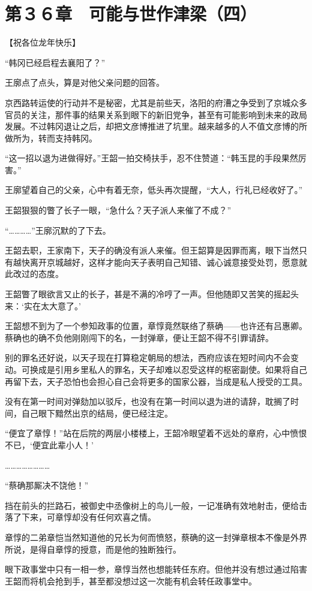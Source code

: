 \section{第３６章　可能与世作津梁（四）}

【祝各位龙年快乐】

“韩冈已经启程去襄阳了？”

王廓点了点头，算是对他父亲问题的回答。

京西路转运使的行动并不是秘密，尤其是前些天，洛阳的府漕之争受到了京城众多官员的关注，那件事的结果关系到眼下的新旧党争，甚至有可能影响到未来的政局发展。不过韩冈退让之后，却把文彦博推进了坑里。越来越多的人不值文彦博的所做所为，转而支持韩冈。

“这一招以退为进做得好。”王韶一拍交椅扶手，忍不住赞道：“韩玉昆的手段果然厉害。”

王廓望着自己的父亲，心中有着无奈，低头再次提醒，“大人，行礼已经收好了。”

王韶狠狠的瞥了长子一眼，“急什么？天子派人来催了不成？”

“…………”王廓沉默的了下去。

王韶去职，王家南下，天子的确没有派人来催。但王韶算是因罪而离，眼下当然只有越快离开京城越好，这样才能向天子表明自己知错、诚心诚意接受处罚，愿意就此改过的态度。

王韶瞥了眼欲言又止的长子，甚是不满的冷哼了一声。但他随即又苦笑的摇起头来：‘实在太大意了。’

王韶想不到为了一个参知政事的位置，章惇竟然联络了蔡确——也许还有吕惠卿。蔡确也的确不负他刚刚闯下的名，一封弹章，便让王韶不得不引罪请辞。

别的罪名还好说，以天子现在打算稳定朝局的想法，西府应该在短时间内不会变动。可换成是引用乡里私人的罪名，天子却难以忍受这样的枢密副使。如果将自己再留下去，天子恐怕也会担心自己会将更多的国家公器，当成是私人授受的工具。

没有在第一时间对弹劾加以驳斥，也没有在第一时间以退为进的请辞，耽搁了时间，自己眼下黯然出京的结局，便已经注定。

“便宜了章惇！”站在后院的两层小楼楼上，王韶冷眼望着不远处的章府，心中愤恨不已，‘便宜此辈小人！’

……………………

“蔡确那厮决不饶他！”

挡在前头的拦路石，被御史中丞像树上的鸟儿一般，一记准确有效地射击，便给击落了下来，可章惇却没有任何欢喜之情。

章惇的二弟章恺当然知道他的兄长为何而愤怒，蔡确的这一封弹章根本不像是外界所说，是得自章惇的授意，而是他的独断独行。

眼下政事堂中只有一相一参，章惇当然也想能转任东府。但他并没有想过通过陷害王韶而将机会抢到手，甚至都没想过这一次能有机会转任政事堂中。

